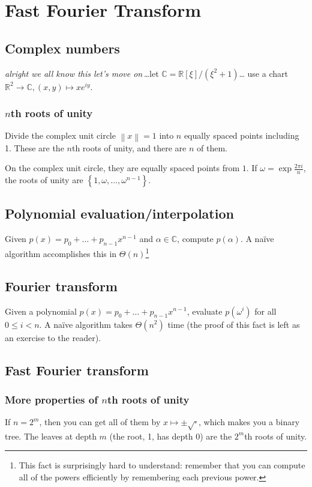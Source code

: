 \chapter{Fast Fourier Transform}
\section{Complex numbers}
\emph{alright we all know this let's move on\,\ldots}let \(\mathbb{C} = \mathbb{R}[\xi]/\left(\xi^2+1\right)\)\ldots%
use a chart \(\mathbb{R}^2\to\mathbb{C}, \left(x,y\right)\mapsto xe^{iy}\).

\subsection{\(n\)th roots of unity}
Divide the complex unit circle \(\left\|x\right\| = 1\) into \(n\) equally spaced points including 1.
These are the \(n\)th roots of unity, and there are \(n\) of them.

On the complex unit circle, they are equally spaced points from \(1\).
If \(\omega = \exp\frac{2\pi i}{n}\), the roots of unity are \(\left\{1, \omega, \ldots, \omega^{n - 1}\right\}\).

\section{Polynomial evaluation/interpolation}
Given \(p(x) = p_0 + \ldots + p_{n - 1}x^{n - 1}\) and \(\alpha \in \mathbb{C}\), compute \(p(\alpha)\).
A na\"ive algorithm accomplishes this in \(\Theta(n)\)\footnote{This fact is surprisingly hard to understand: remember that you can compute all of the powers efficiently by remembering each previous power.}

\section{Fourier transform}
Given a polynomial \(p(x) = p_0 + \ldots + p_{n - 1}x^{n - 1}\), evaluate \(p(\omega^i)\) for all \(0 \leq i < n\). A na\"ive algorithm takes \(\Theta(n^2)\) time (the proof of this fact is left as an exercise to the reader).

\section{Fast Fourier transform}
\subsection{More properties of \(n\)th roots of unity}
If \(n = 2^m\), then you can get all of them by \(x \mapsto \pm\sqrt{\cdot}\), which makes you a binary tree. The leaves at depth \(m\) (the root, 1, has depth 0) are the \(2^m\)th roots of unity.

